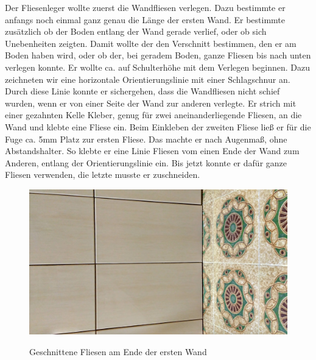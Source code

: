 Der Fliesenleger wollte zuerst die Wandfliesen verlegen. Dazu bestimmte er anfangs noch einmal ganz genau die Länge der ersten Wand. Er bestimmte zusätzlich ob der Boden entlang der Wand gerade verlief, oder ob sich Unebenheiten zeigten. Damit wollte der den Verschnitt bestimmen, den er am Boden haben wird, oder ob der, bei geradem Boden, ganze Fliesen bis nach unten verlegen konnte. Er wollte ca. auf Schulterhöhe mit dem Verlegen beginnen. Dazu zeichneten wir eine horizontale Orientierungslinie mit einer Schlagschnur an. Durch diese Linie konnte er sichergehen, dass die Wandfliesen nicht schief wurden, wenn er von einer Seite der Wand zur anderen verlegte. Er strich mit einer gezahnten Kelle Kleber, genug für zwei aneinanderliegende Fliesen, an die Wand und klebte eine Fliese ein. Beim Einkleben der zweiten Fliese ließ er für die Fuge ca. 5mm Platz zur ersten Fliese. Das machte er nach Augenmaß, ohne Abstandshalter. So klebte er eine Linie Fliesen vom einen Ende der Wand zum Anderen, entlang der Orientierungslinie ein. Bis jetzt konnte er dafür ganze Fliesen verwenden, die letzte musste er zuschneiden.

\begin{figure}[h]
	\begin{center}
		\noindent\includegraphics[scale=0.1]{Resources/Praktikum/IMG_20180806_081044_HDR.jpg}
		\label{wandFlieseSchneiden}
		\caption{Geschnittene Fliesen am Ende der ersten Wand}	
	\end{center}
\end{figure}

